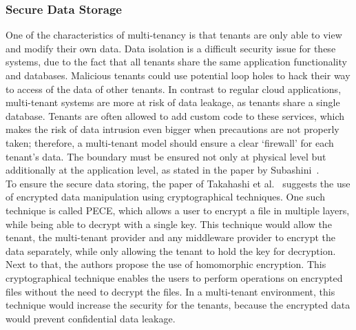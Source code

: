 \subsubsection{Secure Data Storage}
One of the characteristics of multi-tenancy is that tenants are only able to view and modify their own data.
Data isolation is a difficult security issue for these systems, due to the fact that all tenants share the same application functionality and databases. 
Malicious tenants could use potential loop holes to hack their way to access of the data of other tenants. 
In contrast to regular cloud applications, multi-tenant systems are more at risk of data leakage, as tenants share a single database.
Tenants are often allowed to add custom code to these services, which makes the risk of data intrusion even bigger when precautions are not properly taken; 
therefore, a multi-tenant model should ensure a clear ‘firewall’ for each tenant’s data.
The boundary must be ensured not only at physical level but additionally at the application level, as stated in the paper by Subashini~\cite{Subashini2011Security}.\\

To ensure the secure data storing, the paper of Takahashi et al.~\cite{Takahashi2012Security} suggests the use of encrypted data manipulation using cryptographical techniques. 
One such technique is called \acf{PECE}, which allows a user to encrypt a file in multiple layers, while being able to decrypt with a single key.
This technique would allow the tenant, the multi-tenant provider and any middleware provider to encrypt the data separately, while only allowing the tenant to hold the key for decryption.
Next to that, the authors propose the use of homomorphic encryption. 
This cryptographical technique enables the users to perform operations on encrypted files without the need to decrypt the files.
In a multi-tenant environment, this technique would increase the security for the tenants, because the encrypted data would prevent confidential data leakage.

